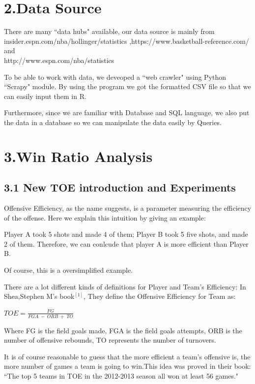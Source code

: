 \documentclass[11pt]{article}
\begin{document}
\section*{2.Data Source}
\hspace{1.5em} There are many ``data hubs" available, our data source is mainly from \\insider.espn.com/nba/hollinger/statistics ,https://www.basketball-reference.com/ and\\ http://www.espn.com/nba/statistics

To be able to work with data, we deveoped a ``web crawler" using Python ``Scrapy" module. By using the program we got the formatted CSV file so that we can easily input them in R.

Furthermore, since we are familiar with Database and SQL language, we also put the data in a database so we can manipulate the data easily by Queries.
\section*{3.Win Ratio Analysis}
\subsection*{3.1 New TOE introduction and Experiments}
\hspace{1.5em}Offensive Efficiency, as the name suggests, is a parameter measuring the efficiency of the offense. Here we explain this intuition by giving an example:

Player A took 5 shots and made 4 of them; Player B took 5 five shots, and made 2 of them. Therefore, we can conlcude that player A is more efficient than Player B.

Of course, this is a oversimplified example.

There are a lot different kinds of definitions for Player and Team's Efficiency:
In Shea,Stephen M's book$^{[1]}$, They define the Offensive Efficiency for Team as:
\begin{center}
$TOE = \frac{FG}{FGA \;-\; ORB\; + \;TO}$
\end{center}

Where FG is the field goals made, FGA is the field goals attempts, ORB is the number of offensive rebounds, TO represents the number of turnovers. 

It is of course reasonable to guess that the more efficient a team's offensive is, the more number of games a team is going to win.This idea was proved in their book: ``The top 5 teams in TOE in the 2012-2013 season all won at least 56 games."
\end{document}
